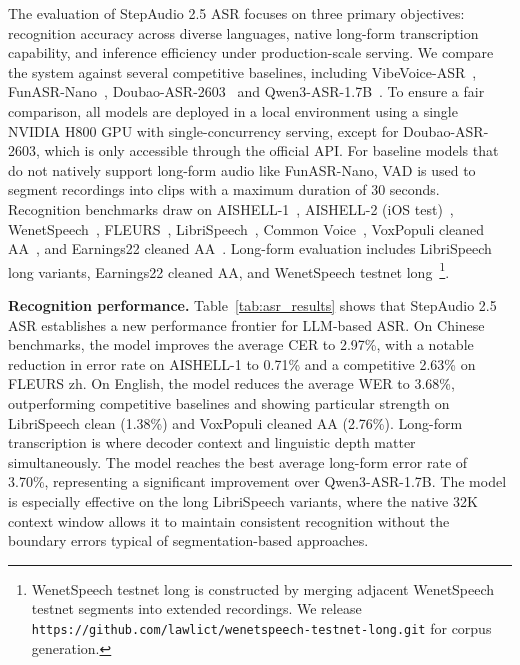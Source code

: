 \documentclass{llmxive}
\providecommand{\url}[1]{\texttt{#1}}
\begin{document}
The evaluation of StepAudio 2.5 ASR focuses on three primary objectives: recognition accuracy across diverse languages, native long-form transcription capability, and inference efficiency under production-scale serving. We compare the system against several competitive baselines, including VibeVoice-ASR~\citep{peng2026vibevoiceasrtechnicalreport}, FunASR-Nano~\citep{an2025funasrtechnicalreport}, Doubao-ASR-2603~\citep{bai2024seed} and Qwen3-ASR-1.7B~\citep{shi2026qwen3asrtechnicalreport}. To ensure a fair comparison, all models are deployed in a local environment using a single NVIDIA H800 GPU with single-concurrency serving, except for Doubao-ASR-2603, which is only accessible through the official API. For baseline models that do not natively support long-form audio like FunASR-Nano, VAD is used to segment recordings into clips with a maximum duration of 30 seconds. Recognition benchmarks draw on AISHELL-1~\citep{bu2017aishell}, AISHELL-2 (iOS test)~\citep{du2018aishell2}, WenetSpeech~\citep{zhang2022wenetspeech}, FLEURS~\citep{conneau2022fleurs}, LibriSpeech~\citep{panayotov2015librispeech}, Common Voice~\citep{ardila2020commonvoice}, VoxPopuli cleaned AA~\citep{artificialanalysis2026voxpopulicleaned}, and Earnings22 cleaned AA~\citep{artificialanalysis2026earnings22cleaned}. Long-form evaluation includes LibriSpeech long variants, Earnings22 cleaned AA, and WenetSpeech testnet long~\footnote{
WenetSpeech testnet long is constructed by merging adjacent WenetSpeech testnet segments into extended recordings. We release \url{https://github.com/lawlict/wenetspeech-testnet-long.git} for corpus generation.}.


\textbf{Recognition performance.} Table~\ref{tab:asr_results} shows that StepAudio 2.5 ASR establishes a new performance frontier for LLM-based ASR. On Chinese benchmarks, the model improves the average CER to 2.97\%, with a notable reduction in error rate on AISHELL-1 to 0.71\% and a competitive 2.63\% on FLEURS zh. On English, the model reduces the average WER to 3.68\%, outperforming competitive baselines and showing particular strength on LibriSpeech clean (1.38\%) and VoxPopuli cleaned AA (2.76\%). Long-form transcription is where decoder context and linguistic depth matter simultaneously. The model reaches the best average long-form error rate of 3.70\%, representing a significant improvement over Qwen3-ASR-1.7B. The model is especially effective on the long LibriSpeech variants, where the native 32K context window allows it to maintain consistent recognition without the boundary errors typical of segmentation-based approaches.
\end{document}
